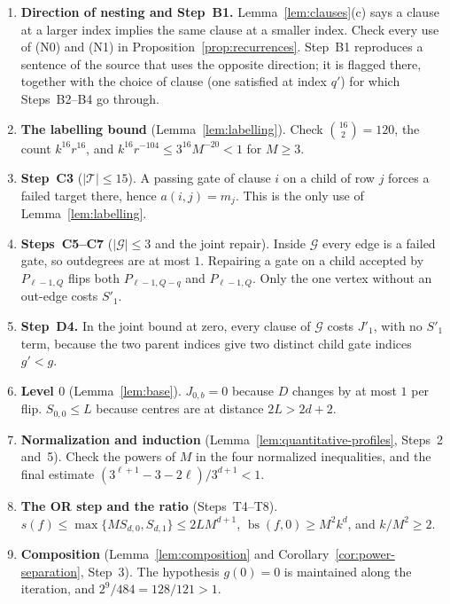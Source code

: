 \documentclass[11pt]{article}
\newcommand{\bs}{\operatorname{bs}}
\theoremstyle{definition}
\theoremstyle{remark}
\begin{document}
\begin{enumerate}[leftmargin=*]
\item \textbf{Direction of nesting and Step~B1.} Lemma~\ref{lem:clauses}(c) says a clause at a larger index implies the same clause at a smaller index. Check every use of (N0) and (N1) in Proposition~\ref{prop:recurrences}. Step~B1 reproduces a sentence of the source that uses the opposite direction; it is flagged there, together with the choice of clause (one satisfied at index \(q'\)) for which Steps~B2--B4 go through.
\item \textbf{The labelling bound} (Lemma~\ref{lem:labelling}). Check \(\binom{16}{2}=120\), the count \(k^{16}r^{16}\), and \(k^{16}r^{-104}\le3^{16}M^{-20}<1\) for \(M\ge3\).
\item \textbf{Step~C3} (\(|\mathcal T|\le15\)). A passing gate of clause \(i\) on a child of row \(j\) forces a failed target there, hence \(a(i,j)=m_j\). This is the only use of Lemma~\ref{lem:labelling}.
\item \textbf{Steps~C5--C7} (\(|\mathcal G|\le3\) and the joint repair). Inside \(\mathcal G\) every edge is a failed gate, so outdegrees are at most \(1\). Repairing a gate on a child accepted by \(P_{\ell-1,Q}\) flips both \(P_{\ell-1,Q-q}\) and \(P_{\ell-1,Q}\). Only the one vertex without an out-edge costs \(S'_1\).
\item \textbf{Step~D4.} In the joint bound at zero, every clause of \(\mathcal G\) costs \(J'_1\), with no \(S'_1\) term, because the two parent indices give two distinct child gate indices \(g'<g\).
\item \textbf{Level \(0\)} (Lemma~\ref{lem:base}). \(J_{0,b}=0\) because \(D\) changes by at most \(1\) per flip. \(S_{0,0}\le L\) because centres are at distance \(2L>2d+2\).
\item \textbf{Normalization and induction} (Lemma~\ref{lem:quantitative-profiles}, Steps~2 and~5). Check the powers of \(M\) in the four normalized inequalities, and the final estimate \((3^{\ell+1}-3-2\ell)/3^{d+1}<1\).
\item \textbf{The OR step and the ratio} (Steps~T4--T8). \(s(f)\le\max\{MS_{d,0},S_{d,1}\}\le2LM^{d+1}\), \(\bs(f,0)\ge M^2k^d\), and \(k/M^2\ge2\).
\item \textbf{Composition} (Lemma~\ref{lem:composition} and Corollary~\ref{cor:power-separation}, Step~3). The hypothesis \(g(0)=0\) is maintained along the iteration, and \(2^9/484=128/121>1\).
\end{enumerate}



\end{document}

